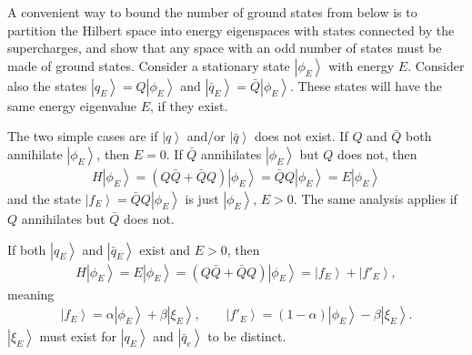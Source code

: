 \documentclass[12pt]{article} %
\newcommand{\ket}[1]{\left|#1\right\rangle}
\begin{document}
A convenient way to bound the number of ground states from below is to partition the Hilbert space into energy eigenspaces with states connected by the supercharges, and show that any space with an odd number of states must be made of ground states. Consider a stationary state $\ket{\phi_E}$ with energy $E$. Consider also the states $\ket{q_E} = Q\ket{\phi_E}$ and $\ket{\bar q_E}= \bar Q \ket{\phi_E}$. These states will have the same energy eigenvalue $E$, if they exist. 

The two simple cases are if $\ket{q}$ and/or $\ket{\bar q}$ does not exist. If $Q$ and $\bar Q$ both annihilate $\ket{\phi_E}$, then $E=0$. If $\bar Q$ annihilates $\ket{\phi_E}$ but $Q$ does not, then 
\begin{align}
H\ket{\phi_E} = (Q\bar{Q} + \bar QQ)\ket{\phi_E} = \bar QQ\ket{\phi_E} = E\ket{\phi_E}
\end{align}
and the state $\ket{f_E} = \bar QQ\ket{\phi_E}$ is just $\ket{\phi_E}$, $E>0$. The same analysis applies if $Q$ annihilates but $\bar Q$ does not.

If both $\ket{q_E}$ and $\ket{\bar q_E}$ exist and $E>0$, then
\begin{align}
H\ket{\phi_E} = E\ket{\phi_E} = (Q\bar Q + \bar QQ)\ket{\phi_E} = \ket{f_E} + 
	\ket{f'_E},
\end{align}
meaning 
\begin{align}
\ket{f_E} = \alpha\ket{\phi_E} + \beta\ket{\xi_E},\qquad \ket{f'_E} = 
	(1-\alpha)\ket{\phi_E} - \beta\ket{\xi_E}.
\end{align}
$\ket{\xi_E}$ must exist for $\ket{q_E}$ and $\ket{\bar q_e}$ to be distinct.
\end{document}
